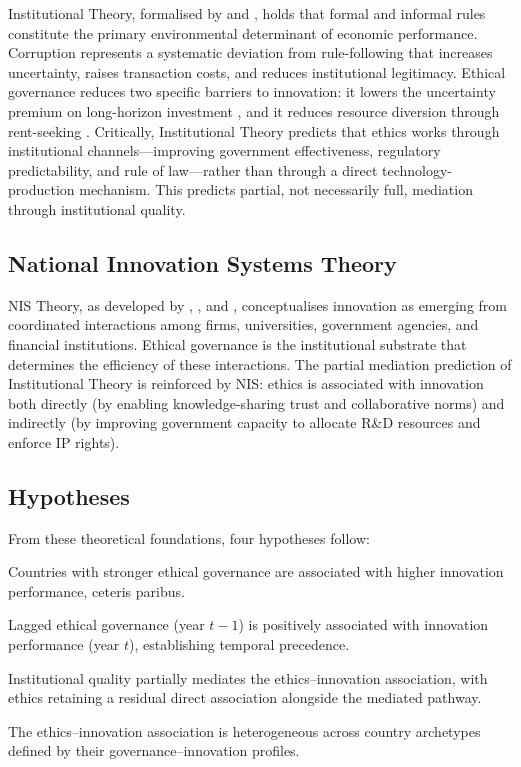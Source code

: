 \documentclass[pdflatex,sn-apa]{sn-jnl}
\begin{document}
Institutional Theory, formalised by \citet{north1990} and \citet{scott2001}, holds that formal and informal rules constitute the primary environmental determinant of economic performance. Corruption represents a systematic deviation from rule-following that increases uncertainty, raises transaction costs, and reduces institutional legitimacy. Ethical governance reduces two specific barriers to innovation: it lowers the uncertainty premium on long-horizon investment \citep{porter1990}, and it reduces resource diversion through rent-seeking \citep{mauro1995}. Critically, Institutional Theory predicts that ethics works through institutional channels---improving government effectiveness, regulatory predictability, and rule of law---rather than through a direct technology-production mechanism. This predicts partial, not necessarily full, mediation through institutional quality.

\subsection{National Innovation Systems Theory}

NIS Theory, as developed by \citet{freeman1987}, \citet{lundvall1992}, and \citet{nelson1993}, conceptualises innovation as emerging from coordinated interactions among firms, universities, government agencies, and financial institutions. Ethical governance is the institutional substrate that determines the efficiency of these interactions. The partial mediation prediction of Institutional Theory is reinforced by NIS: ethics is associated with innovation both directly (by enabling knowledge-sharing trust and collaborative norms) and indirectly (by improving government capacity to allocate R\&D resources and enforce IP rights).

\subsection{Hypotheses}

From these theoretical foundations, four hypotheses follow:

\begin{description}[leftmargin=1.2cm,style=nextline]
\item[H1:] Countries with stronger ethical governance are associated with higher innovation performance, ceteris paribus.
\item[H2:] Lagged ethical governance (year $t-1$) is positively associated with innovation performance (year $t$), establishing temporal precedence.
\item[H3:] Institutional quality partially mediates the ethics--innovation association, with ethics retaining a residual direct association alongside the mediated pathway.
\item[H4:] The ethics--innovation association is heterogeneous across country archetypes defined by their governance--innovation profiles.
\end{description}
\end{document}
